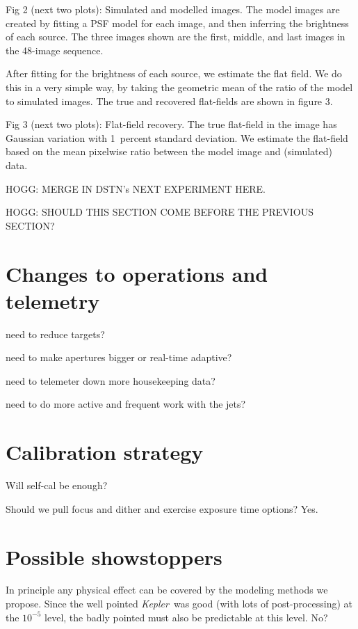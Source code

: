 \documentclass[letterpaper,12pt,preprint]{aastex}
\newcommand{\observatory}[1]{\textsl{#1}}
\newcommand{\Kepler}{\observatory{Kepler}}
\begin{document}
Fig 2 (next two plots): Simulated and modelled images.  The model images are created by fitting a PSF model for each image, and then inferring the brightness of each source.  The three images shown are the first, middle, and last images in the 48-image sequence.

After fitting for the brightness of each source, we estimate the flat field.  We do this in a very simple way, by taking the geometric mean of the ratio of the model to simulated images.  The true and recovered flat-fields are shown in figure 3.

Fig 3 (next two plots): Flat-field recovery.  The true flat-field in the image has Gaussian variation with 1~percent standard deviation.  We estimate the flat-field based on the mean pixelwise ratio between the model image and (simulated) data.

HOGG: MERGE IN DSTN's NEXT EXPERIMENT HERE.

HOGG: SHOULD THIS SECTION COME BEFORE THE PREVIOUS SECTION?


\section{Changes to operations and telemetry}\label{sec:operations}

need to reduce targets?

need to make apertures bigger or real-time adaptive?

need to telemeter down more housekeeping data?

need to do more active and frequent work with the jets?

\section{Calibration strategy}\label{sec:calibration}

Will self-cal be enough?

Should we pull focus and dither and exercise exposure time options?  Yes.

\section{Possible showstoppers}\label{sec:stop}

In principle any physical effect can be covered by the modeling
  methods we propose.
Since the well pointed \Kepler\ was good (with lots of post-processing)
  at the $10^{-5}$ level,
  the badly pointed must also be predictable at this level.  No?
\end{document}
